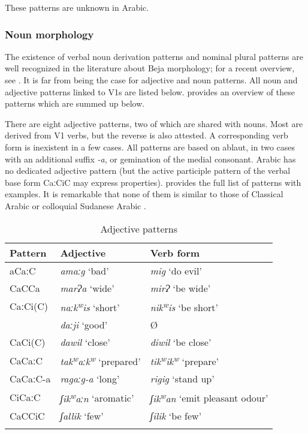 \documentclass[output=paper]{langsci/langscibook}
\begin{document}
These patterns are unknown in Arabic.
 \subsubsection{Noun morphology}

The existence of verbal noun derivation patterns and nominal plural patterns are well recognized in the literature about Beja morphology; for a recent overview, see \citet{Appleyard2007}. It is far from being the case for adjective and noun patterns. All noun and adjective patterns linked to V1s are listed below. \citet{Vanhove2012} provides an overview of these patterns which are summed up below.

There are eight adjective patterns, two of which are shared with nouns. Most are derived from V1 verbs, but the reverse is also attested. A corresponding verb form is inexistent in a few cases. All patterns are based on ablaut, in two cases with an additional suffix \textit{\nobreakdash-a}, or gemination of the medial consonant. Arabic has no dedicated adjective pattern (but the active participle pattern of the verbal base form CaːCiC may express properties).  provides the full list of patterns with examples. It is remarkable that none of them is similar to those of Classical Arabic or colloquial Sudanese Arabic \citep[17]{Bergman2002}.

\begin{table}
\begin{tabular}{lll}
\lsptoprule
Pattern & Adjective & Verb form\\\midrule
aCaːC & \textit{amaːg} ‘bad’ & \textit{mig} ‘do evil’\\
CaCCa & \textit{marɁa} ‘wide’ & \textit{mirɁ} ‘be wide’\\
CaːCi(C) & \textit{naːk\textsuperscript{w}}\textit{is} ‘short’ & \textit{nik\textsuperscript{w}}\textit{is} ‘be short’\\
& \textit{daːji} ‘good’ & Ø\\
CaCi(C) & \textit{dawil} ‘close’ & \textit{diwil} ‘be close’\\
CaCaːC & \textit{tak\textsuperscript{w}}\textit{aːk\textsuperscript{w}} ‘prepared’ & \textit{tik\textsuperscript{w}}\textit{ik\textsuperscript{w}} ‘prepare’\\
CaCaːC-a & \textit{ragaːg-a} ‘long’ & \textit{rigig} ‘stand up’\\
CiCaːC & \textit{ʃik\textsuperscript{w}}\textit{aːn} ‘aromatic’ & \textit{ʃik\textsuperscript{w}}\textit{an} ‘emit pleasant odour’\\
CaCCiC & \textit{ʃallik} ‘few’ & \textit{ʃilik} ‘be few’\\
\lspbottomrule
\end{tabular} 
\caption{Adjective patterns}
\label{tab:vanhove:5}
\end{table}
\end{document}
